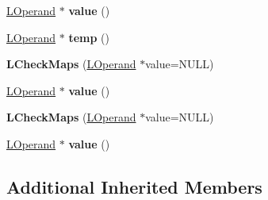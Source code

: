 \begin{DoxyCompactItemize}
\item 
\hyperlink{classv8_1_1internal_1_1_l_operand}{L\+Operand} $\ast$ {\bfseries value} ()\hypertarget{classv8_1_1internal_1_1_l_check_maps_a0ce50e2f6650671c56bebe236ebc24cf}{}\label{classv8_1_1internal_1_1_l_check_maps_a0ce50e2f6650671c56bebe236ebc24cf}

\item 
\hyperlink{classv8_1_1internal_1_1_l_operand}{L\+Operand} $\ast$ {\bfseries temp} ()\hypertarget{classv8_1_1internal_1_1_l_check_maps_a92f3028bc206c320b88c7f8116a82904}{}\label{classv8_1_1internal_1_1_l_check_maps_a92f3028bc206c320b88c7f8116a82904}

\item 
{\bfseries L\+Check\+Maps} (\hyperlink{classv8_1_1internal_1_1_l_operand}{L\+Operand} $\ast$value=N\+U\+LL)\hypertarget{classv8_1_1internal_1_1_l_check_maps_a295bd750be5836ee2b03ec4c56192d16}{}\label{classv8_1_1internal_1_1_l_check_maps_a295bd750be5836ee2b03ec4c56192d16}

\item 
\hyperlink{classv8_1_1internal_1_1_l_operand}{L\+Operand} $\ast$ {\bfseries value} ()\hypertarget{classv8_1_1internal_1_1_l_check_maps_a0ce50e2f6650671c56bebe236ebc24cf}{}\label{classv8_1_1internal_1_1_l_check_maps_a0ce50e2f6650671c56bebe236ebc24cf}

\item 
{\bfseries L\+Check\+Maps} (\hyperlink{classv8_1_1internal_1_1_l_operand}{L\+Operand} $\ast$value=N\+U\+LL)\hypertarget{classv8_1_1internal_1_1_l_check_maps_a295bd750be5836ee2b03ec4c56192d16}{}\label{classv8_1_1internal_1_1_l_check_maps_a295bd750be5836ee2b03ec4c56192d16}

\item 
\hyperlink{classv8_1_1internal_1_1_l_operand}{L\+Operand} $\ast$ {\bfseries value} ()\hypertarget{classv8_1_1internal_1_1_l_check_maps_a0ce50e2f6650671c56bebe236ebc24cf}{}\label{classv8_1_1internal_1_1_l_check_maps_a0ce50e2f6650671c56bebe236ebc24cf}

\end{DoxyCompactItemize}
\subsection*{Additional Inherited Members}


